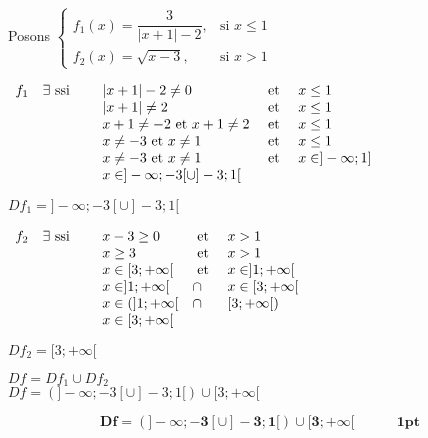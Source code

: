 \documentclass[12pt,a4paper]{article}
\begin{document}
\begin{enumerate}
Posons  $\left\{
        \begin{array}{ll}
            f_{1}(x) = \dfrac{3}{|x+1| - 2}, & \text{si } x \leq 1 \\
            f_{2}(x) = \sqrt{x - 3}, & \text{si } x > 1
        \end{array}
    \right.$
    
\( 
\begin{array}{llll}
            f_{1}\quad \exists \text{ ssi }& \quad  |x+1| - 2 \neq 0 & \text{ et } & x \leq 1 \\
       			 																&\quad  |x+1|  \neq 2 & \text{ et } & x \leq 1 \\
       																			&\quad  x+1  \neq -2\text{ et } x+1  \neq 2 & \text{ et } & x \leq 1 \\
       																			&\quad  x \neq -3\text{ et } x \neq 1 & \text{ et } & x \leq 1 \\
       																			&\quad  x \neq -3\text{ et } x \neq 1 & \text{ et } & x \in ]-\infty;1] \\
       																			&\quad x \in ]-\infty;-3[\cup]-3;1[\\
        \end{array} \\
\) 

\begin{center}
\( Df_{1} = ]-\infty;-3[\cup]-3;1[ \)\\
\end{center}     

\( 
\begin{array}{llll}
            f_{2}\quad \exists \text{ ssi }& \quad  x - 3 \geq 0 & \text{ et } & x > 1 \\
       			 																& \quad  x  \geq 3 & \text{ et } & x > 1 \\
       																			& \quad  x\in [3;+\infty[ & \text{ et } & x\in ]1;+\infty[\\
       																			& \quad  x \in ]1;+\infty[ & \cap & x \in[3;+\infty[\\
       																			& \quad  x \in ( ]1;+\infty[ & \cap &  [3;+\infty[)\\
       																			& \quad x \in [3;+\infty[
        \end{array} \\
\) 

\begin{center}
\( Df_{2} = [3;+\infty[ \)\\
\end{center}     

\begin{center}
\( Df=Df_{1} \cup Df_{2} \)\\
\( Df=(]-\infty;-3[\cup]-3;1[)\cup[3;+\infty[ \)
\end{center} 

              \begin{resultbox}
            \[
                \mathbf{Df = \left( ]-\infty;-3[\cup]-3;1[\right) \cup[3;+\infty[ \quad\quad\quad \textbf{1pt}}
            \]
        \end{resultbox}     
    
\end{enumerate}
\end{document}

